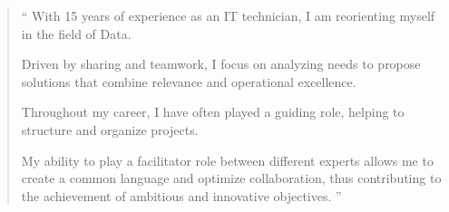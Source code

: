 \documentclass[10pt,a4paper,ragged2e,withhyper,normalphoto]{altacv}
\begin{document}


\makecvheader


\begin{quote}
``
With 15 years of experience as an IT technician, I am reorienting myself in the field of Data.

Driven by sharing and teamwork, I focus on analyzing needs to propose solutions that combine relevance and operational excellence.

\medskip

Throughout my career, I have often played a guiding role, helping to structure and organize projects.

My ability to play a facilitator role between different experts allows me to create a common language and optimize collaboration, thus contributing to the achievement of ambitious and innovative objectives.
''
\end{quote}

\bigskip

\end{document}
